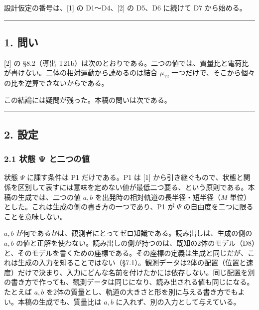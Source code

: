 \documentclass[
  a4paper,
]{ltjsarticle}
\begin{document}
設計仮定の番号は、{[}1{]} の D1〜D4、{[}2{]} の D5、D6 に続けて D7
から始める。

\begin{center}\rule{0.5\linewidth}{0.5pt}\end{center}

\subsection{1. 問い}\label{ux554fux3044}

{[}2{]} の §8.2（導出
T21b）は次のとおりである。二つの値では、質量比と電荷比が書けない。二体の相対運動から読めるのは結合
\(\mu_{12}\) 一つだけで、そこから個々の比を逆算できないからである。

この結論には疑問が残った。本稿の問いは次である。

\begin{center}
\end{center}

\begin{center}\rule{0.5\linewidth}{0.5pt}\end{center}

\subsection{2. 設定}\label{ux8a2dux5b9a}

\subsubsection{2.1 状態 Ψ
と二つの値}\label{ux72b6ux614b-ux3c8-ux3068ux4e8cux3064ux306eux5024}

状態 \(\Psi\) に課す条件は P1 だけである。P1 は {[}1{]}
から引き継ぐもので、状態と関係を区別して表すには意味を定めない値が最低二つ要る、という原則である。本稿の生成では、二つの値
\(a, b\) を出発時の相対軌道の長半径・短半径（\(M\)
単位）とした。これは生成の側の書き方の一つであり、P1 が \(\Psi\)
の自由度を二つに限ることを意味しない。

\(a, b\)
が何であるかは、観測者にとってゼロ知識である。読み出しは、生成の側の
\(a, b\)
の値と正解を使わない。読み出しの側が持つのは、既知の2体のモデル（D8）と、そのモデルを書くための座標である。その座標の定義は生成と同じだが、これは生成の入力を知ることではない（§7.1）。観測データは2体の配置（位置と速度）だけで決まり、入力にどんな名前を付けたかには依存しない。同じ配置を別の書き方で作っても、観測データは同じになり、読み出される値も同じになる。たとえば
\(a, b\)
を2体の質量とし、軌道の大きさと形を別に与える書き方でもよい。本稿の生成でも、質量比は
\(a, b\) に入れず、別の入力として与えている。
\end{document}
